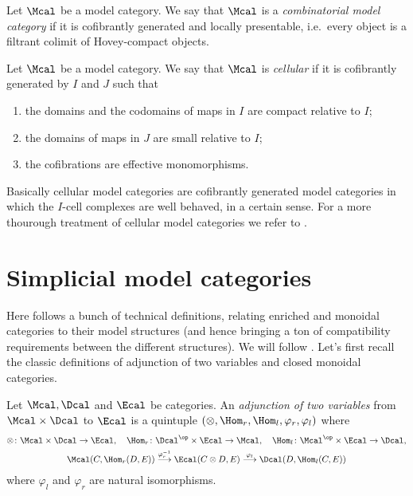         \begin{defn}
            \label{defn:combinatorial_model_cat}
            Let $\Mcal$ be a model category. We say that $\Mcal$ is a \emph{combinatorial model category} if it is cofibrantly generated and locally presentable, i.e.\ every object is a filtrant colimit of Hovey-compact objects.
        \end{defn}

        \begin{defn}
            \label{defn:cellular_model_categories}
            Let $\Mcal$ be a model category. We say that $\Mcal$ is \emph{cellular} if it is cofibrantly generated by $I$ and $J$ such that 
            \begin{enumerate}
                \item the domains and the codomains of maps in $I$ are compact relative to $I$;
                \item the domains of maps in $J$ are small relative to $I$;
                \item the cofibrations are effective monomorphisms.
            \end{enumerate}
        \end{defn}
        Basically cellular model categories are cofibrantly generated model categories in which the $I$-cell complexes are well behaved, in a certain sense. For a more thourough treatment of cellular model categories we refer to \cite[Chapter~12]{Hirs:loc}.

    \section{Simplicial model categories}
        Here follows a bunch of technical definitions, relating enriched and monoidal categories to their model structures (and hence bringing a ton of compatibility requirements between the different structures). We will follow \cite[Chapter~4]{Hov:model}.
        Let's first recall the classic definitions of adjunction of two variables and closed monoidal categories.
        \begin{defn}
            \label{defn:adjunction_two_variables}
            Let $\Mcal, \Dcal$ and $\Ecal$ be categories. An \emph{adjunction of two variables} from $\Mcal \times \Dcal$ to $\Ecal$ is a quintuple $(\otimes, \Hom_r, \Hom_l, \varphi_r, \varphi_l)$ where 
            \begin{gather*}
                \otimes\colon \Mcal \times \Dcal \to \Ecal, \quad \Hom_r\colon \Dcal^{\op} \times \Ecal \to \Mcal, \quad \Hom_l\colon \Mcal^{\op} \times \Ecal \to \Dcal, \\
                \Mcal(C, \Hom_r(D, E)) \stackrel{\varphi_r^{-1}}{\longrightarrow} \Ecal(C \otimes D, E) \stackrel{\varphi_l}{\longrightarrow} \Dcal(D, \Hom_l(C, E))
            \end{gather*}
            where $\varphi_l$ and $\varphi_r$ are natural isomorphisms.
        \end{defn}

